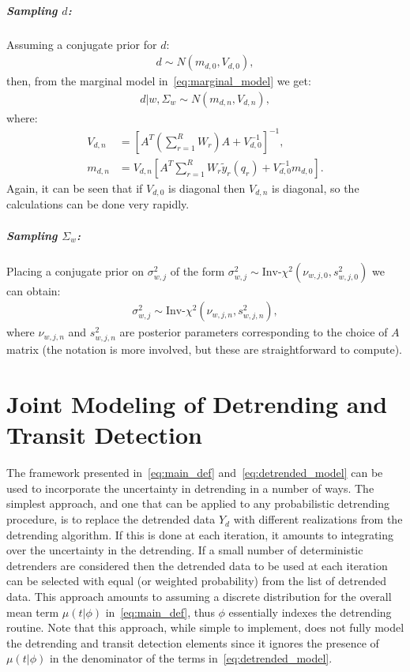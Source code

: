 \documentclass[a4paper,11pt]{article}
\begin{document}
\subparagraph{Sampling $d$:} Assuming a conjugate prior for $d$:
\begin{align*}
 d \sim N(m_{d,0},V_{d,0}) ,
\end{align*}
then, from the marginal model in~\eqref{eq:marginal_model} we get:
\begin{align*}
 d | w,\Sigma_{w} \sim N(m_{d,n},V_{d,n}) ,
\end{align*}
where:
\begin{align*}
 V_{d,n} &= \left[A^{T}\left(\sum_{r=1}^{R}W_{r}\right)A + V_{d,0}^{-1}\right]^{-1} , \\
 m_{d,n} &= V_{d,n}\left[A^{T}\sum_{r=1}^{R}W_{r}\tilde{y}_{r}(q_{r}) + V_{d,0}^{-1}m_{d,0}\right] .
\end{align*}
Again, it can be seen that if $V_{d,0}$ is diagonal then $V_{d,n}$ is diagonal, so the calculations can be done very rapidly. 
\subparagraph{Sampling $\Sigma_{w}$:} Placing a conjugate prior on $\sigma^{2}_{w,j}$ of the form $\sigma^{2}_{w,j}\sim\textrm{Inv-}\chi^{2}(\nu_{w,j,0},s_{w,j,0}^{2})$ we can obtain:
\begin{align*}
 \sigma^{2}_{w,j}\sim\textrm{Inv-}\chi^{2}(\nu_{w,j,n},s_{w,j,n}^{2}) ,
\end{align*}
where $\nu_{w,j,n}$ and $s_{w,j,n}^{2}$ are posterior parameters corresponding to the choice of $A$ matrix (the notation is more involved, but these are straightforward to compute).

\section{Joint Modeling of Detrending and Transit Detection}\label{sec:joint_modeling}
The framework presented in~\eqref{eq:main_def} and~\eqref{eq:detrended_model} can be used to incorporate the uncertainty in detrending in a number of ways. The simplest approach, and one that can be applied to any probabilistic detrending procedure, is to replace the detrended data $Y_{d}$ with different realizations from the detrending algorithm. If this is done at each iteration, it amounts to integrating over the uncertainty in the detrending. If a small number of deterministic detrenders are considered then the detrended data to be used at each iteration can be selected with equal (or weighted probability) from the list of detrended data. This approach amounts to assuming a discrete distribution for the overall mean term $\mu(t|\phi)$ in~\eqref{eq:main_def}, thus $\phi$ essentially indexes the detrending routine. Note that this approach, while simple to implement, does not fully model the detrending and transit detection elements since it ignores the presence of $\mu(t|\phi)$ in the denominator of the terms in~\eqref{eq:detrended_model}.
\end{document}
